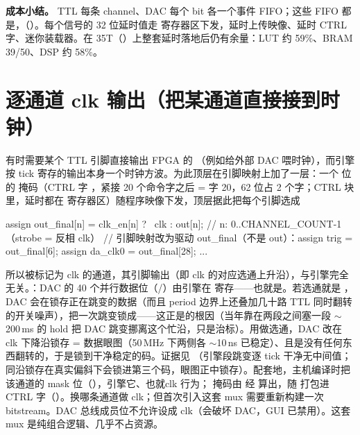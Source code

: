 \documentclass[11pt,oneside,openany]{book}
\begin{document}
\textbf{成本小结。} TTL 每条 channel、DAC 每个 bit 各一个事件 FIFO；这些 FIFO 都是，（）。每个信号的 32 位延时值走  寄存器区下发，延时上传映像、延时 CTRL 字、迷你装载器。在 35T（）上整套延时落地后仍有余量：LUT 约 59\%、BRAM 39/50、DSP 约 58\%。

\section{逐通道 clk 输出（把某通道直接接到时钟）}
有时需要某个 TTL 引脚直接输出 FPGA 的 （例如给外部 DAC 喂时钟），而引擎按 tick 寄存的输出本身一个时钟方波。为此顶层在引脚映射上加了一层：一个  位的  掩码（CTRL 字 ，紧接 20 个命令字之后 = 字 20，62 位占 2 个字；CTRL 块里，延时都在  寄存器区）随程序映像下发，顶层据此把每个引脚选成
\begin{codeblock}
assign out_final[n] = clk_en[n] ? ~clk : out[n];  // n: 0..CHANNEL_COUNT-1（strobe = 反相 clk）
// 引脚映射改为驱动 out_final（不是 out）：assign trig = out_final[6]; assign da_clk0 = out_final[28]; ...
\end{codeblock}
所以被标记为 clk 的通道，其引脚输出（即 clk 的对应选通上升沿），与引擎完全无关。：DAC 的 40 个并行数据位（/）由引擎在  寄存——也就是。若选通就是 ，DAC 会在锁存正在跳变的数据（而且 period 边界上还叠加几十路 TTL 同时翻转的开关噪声），把一次跳变锁成——这正是的根因（当年靠在两段之间塞一段 $\sim$200\,ms 的 hold 把 DAC 跳变挪离这个忙沿，只是治标）。用做选通，DAC 改在 clk 下降沿锁存 = 数据眼图（50\,MHz 下两侧各 $\sim$10\,ns 已稳定）、且是没有任何东西翻转的，于是锁到干净稳定的码。证据见 （引擎段跳变逐 tick 干净无中间值；同沿锁存在真实偏斜下会锁进第三个码，眼图正中锁存）。配套地，主机编译时把该通道的 mask 位（），引擎它、也就clk 行为； 掩码由  经  算出，随  打包进 CTRL 字（）。换哪条通道做 clk；但首次引入这套 mux 需要重新构建一次 bitstream。DAC 总线成员位不允许设成 clk（会破坏 DAC，GUI 已禁用）。这套 mux 是纯组合逻辑、几乎不占资源。
\end{document}

